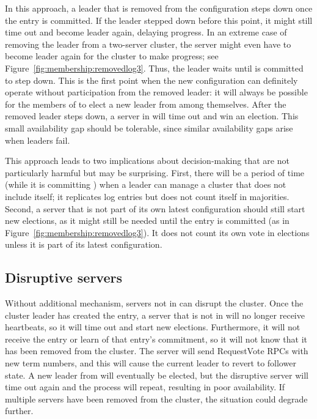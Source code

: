 In this approach, a leader that is removed from the configuration steps
down once the \cnew{} entry is committed. If the leader stepped down
before this point, it might still time out and become leader again,
delaying progress. In an extreme case of removing the leader from a
two-server cluster, the server might even have to become leader again
for the cluster to make progress; see
Figure~\ref{fig:membership:removedlog3}. Thus, the leader waits until
\cnew{} is committed to step down. This is the first point when the new
configuration can definitely operate without participation from the
removed leader: it will always be possible for the members of \cnew{} to
elect a new leader from among themselves.
%
After the removed leader steps down, a server in \cnew{} will time out
and win an election. This small availability gap should be tolerable,
since similar availability gaps arise when leaders fail.

This approach leads to two implications about decision-making that are
not particularly harmful but may be surprising.
%
%
First, there will be a period of time (while it is committing
\cnew{}) when a leader can manage a cluster that does not include
itself; it replicates log entries but does not count itself in
majorities.
%
Second,
a server that is not part of its own latest configuration should
still start new elections, as it might still be needed  until the
\cnew{} entry is committed (as in
Figure~\ref{fig:membership:removedlog3}). It does not count its own vote
in elections unless it is part of its latest configuration.
%

\subsection{Disruptive servers}
\label{membership:availability:disruptive}

Without additional mechanism, servers not in \cnew{} can disrupt the
cluster.
Once the cluster leader has created the \cnew{} entry,
a server that is not in \cnew{} will no longer receive heartbeats, so it
will time out and start new elections.
Furthermore, it will not receive the \cnew{} entry or learn of that
entry's commitment,
so it will not know that it has been removed from the cluster.
The server will send RequestVote
RPCs with new term numbers, and this will cause the current leader to
revert to follower state. A new leader from \cnew{} will eventually be
elected, but the disruptive server will time out again and the process
will repeat, resulting in poor availability. If multiple servers have
been removed from the cluster, the situation could degrade further.



